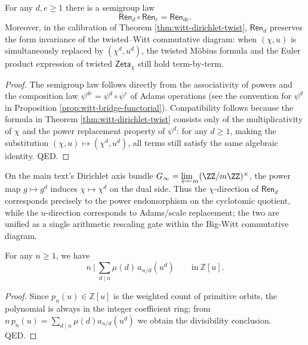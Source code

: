 \begin{proposition}\label{prop:witt-renorm-monoid}
For any \(d,e\ge 1\) there is a semigroup law
\[
\mathsf{Ren}_d\circ\mathsf{Ren}_e=\mathsf{Ren}_{de}.
\]
Moreover, in the calibration of Theorem \ref{thm:witt-dirichlet-twist}, \(\mathsf{Ren}_d\) preserves the form invariance of the twisted--Witt commutative diagram: when \((\chi,u)\) is simultaneously replaced by \((\chi^d,u^d)\), the twisted Möbius formula and the Euler product expression of twisted \(\mathsf{Zeta}_\chi\) still hold term-by-term.
\end{proposition}

\begin{proof}
The semigroup law follows directly from the associativity of powers and the composition law \(\psi^{de}=\psi^d\circ\psi^e\) of Adams operations (see the convention for \(\psi^d\) in Proposition \ref{prop:witt-bridge-functorial}).
Compatibility follows because the formula in Theorem \ref{thm:witt-dirichlet-twist} consists only of the multiplicativity of \(\chi\) and the power replacement property of \(\psi^d\): for any \(d\ge 1\), making the substitution \((\chi,u)\mapsto(\chi^d,u^d)\), all terms still satisfy the same algebraic identity. QED.
\end{proof}

\begin{remark}\label{rem:witt-renorm-cyclotomic-power-shadow}
On the main text's Dirichlet axis bundle \(G_\infty=\varprojlim_m(\ZZ/m\ZZ)^\times\), the power map \(g\mapsto g^d\) induces \(\chi\mapsto\chi^d\) on the dual side.
Thus the \(\chi\)-direction of \(\mathsf{Ren}_d\) corresponds precisely to the power endomorphism on the cyclotomic quotient, while the \(u\)-direction corresponds to Adams/scale replacement; the two are unified as a single arithmetic rescaling gate within the Big-Witt commutative diagram.
\end{remark}

\begin{proposition}\label{prop:witt-necklace-div}
For any $n\ge 1$, we have
\[
n\ \Big|\ \sum_{d\mid n}\mu(d)\,a_{n/d}(u^d)\qquad\text{in}\ \mathbb{Z}[u].
\]
\end{proposition}
\begin{proof}
Since $p_n(u)\in\mathbb{Z}[u]$ is the weighted count of primitive orbits, the polynomial is always in the integer coefficient ring; from $n\,p_n(u)=\sum_{d\mid n}\mu(d)a_{n/d}(u^d)$ we obtain the divisibility conclusion. QED.
\end{proof}

